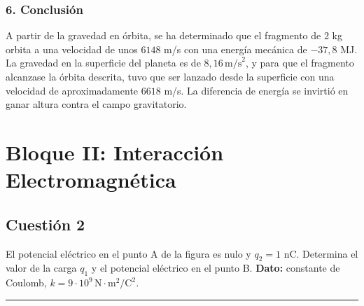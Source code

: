 \subsubsection*{6. Conclusión}
\begin{cajaconclusion}
A partir de la gravedad en órbita, se ha determinado que el fragmento de 2 kg orbita a una velocidad de unos $6148$ m/s con una energía mecánica de $-37,8$ MJ. La gravedad en la superficie del planeta es de $8,16 \, \text{m/s}^2$, y para que el fragmento alcanzase la órbita descrita, tuvo que ser lanzado desde la superficie con una velocidad de aproximadamente $6618$ m/s. La diferencia de energía se invirtió en ganar altura contra el campo gravitatorio.
\end{cajaconclusion}

\newpage

\section{Bloque II: Interacción Electromagnética}
\label{sec:em_2022_jun_ord}

\subsection{Cuestión 2}
\label{subsec:C2_2022_jun_ord}

\begin{cajaenunciado}
El potencial eléctrico en el punto A de la figura es nulo y $q_2 = 1$ nC. Determina el valor de la carga $q_1$ y el potencial eléctrico en el punto B.
\textbf{Dato:} constante de Coulomb, $k = 9 \cdot 10^9 \, \text{N}\cdot\text{m}^2/\text{C}^2$. 
\end{cajaenunciado}
\hrule


